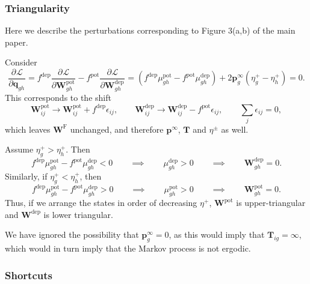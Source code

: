 \documentclass[9pt,twocolumn,twoside,lineno]{pnas-new}
\newcommand{\pdiff}[3][]{\frac{\partial^{#1} #2}{\partial {#3}^{#1}}}
\newcommand{\CL}{\mathcal{L}}
\newcommand{\prob}{\mathbf{p}}
\newcommand{\eq}{\prob^\infty}
\newcommand{\fpt}{\mathbf{T}}
\newcommand{\W}{\mathbf{W}}
\newcommand{\enc}{\mathbf{q}}
\newcommand{\frg}{\W^{\mathrm{F}}}
\newcommand{\pot}{^{\text{pot}}}
\newcommand{\dep}{^{\text{dep}}}
\newcommand{\potdep}{^{\text{pot/dep}}}
\begin{document}
\begin{strip}
\subsubsection{Triangularity}\label{sec:triangular}

Here we describe the perturbations corresponding to Figure 3(a,b) of the main paper.

Consider
%
\begin{equation}\label{eq:shiftqderiv}
  \pdiff{\CL}{\enc_{gh}} =
  f\dep  \pdiff{\CL}{\W\pot _{gh}} - f\pot  \pdiff{\CL}{\W\dep _{gh}}
   = (f\dep  \mu\pot _{gh} - f\pot  \mu\dep _{gh}) + 2\eq_g (\eta^+_g - \eta^+_h)
   = 0.
\end{equation}
%
This corresponds to the shift
%
\begin{equation}\label{eq:shiftq}
  \W\pot _{ij} \to \W\pot _{ij} + f\dep \epsilon_{ij},
  \qquad
  \W\dep _{ij} \to \W\dep _{ij} - f\pot \epsilon_{ij},
  \qquad
  \sum_j \epsilon_{ij} = 0,
\end{equation}
%
which leaves $\frg$ unchanged, and therefore $\eq$, $\fpt$ and $\eta^\pm$ as well.

Assume $\eta^+_g > \eta^+_h$. Then
%
\begin{equation}\label{eq:lowertriangular}
 f\dep  \mu\pot _{gh} - f\pot  \mu\dep _{gh} <0
 \qquad\implies\qquad
 \mu\dep _{gh} >0
 \qquad\implies\qquad
 \W\dep _{gh}=0.
\end{equation}
%
Similarly, if $\eta^+_g < \eta^+_h$, then
%
\begin{equation}\label{eq:uppertriangular}
 f\dep  \mu\pot _{gh} - f\pot  \mu\dep _{gh} > 0
 \qquad\implies\qquad
 \mu\pot _{gh} >0
 \qquad\implies\qquad
 \W\pot _{gh}=0.
\end{equation}
%
Thus, if we arrange the states in order of decreasing $\eta^+$, $\W\pot $ is upper-triangular and $\W\dep $ is lower triangular.

We have ignored the possibility that $\eq_g=0$, as this would imply that $\fpt_{ig}=\infty$, which would in turn imply that the Markov process is not ergodic.


\subsubsection{Shortcuts}\label{sec:shortcuts}


\end{strip}
\end{document}
